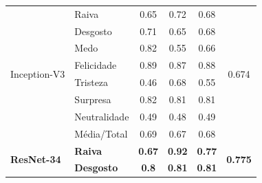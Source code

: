 \begin{table}[]
\begin{tabular}{llcccc}
\multirow{8}{*}{Inception-V3}     & Raiva                 & 0.65                                  & 0.72                                   & 0.68                                  & \multirow{8}{*}{0.674}                \\
                                       & Desgosto              & 0.71                                  & 0.65                                   & 0.68                                  &                                       \\
                                       & Medo                  & 0.82                                  & 0.55                                   & 0.66                                  &                                       \\
                                       & Felicidade            & 0.89                                  & 0.87                                   & 0.88                                  &                                       \\
                                       & Tristeza              & 0.46                                  & 0.68                                   & 0.55                                  &                                       \\
                                       & Surpresa              & 0.82                                  & 0.81                                   & 0.81                                  &                                       \\
                                       & Neutralidade          & 0.49                                  & 0.48                                   & 0.49                                  &                                       \\
                                       & Média/Total           & 0.69                                  & 0.67                                   & 0.68                                  &                                       \\ \hline
\multirow{8}{*}{\textbf{ResNet-34}} & \textbf{Raiva}        & \textbf{0.67}                         & \textbf{0.92}                          & \textbf{0.77}                         & \multirow{8}{*}{\textbf{0.775}}       \\
                                       & \textbf{Desgosto}     & \textbf{0.8}                          & \textbf{0.81}                          & \textbf{0.81}                         &                                       \\

\end{tabular}
\end{table}
